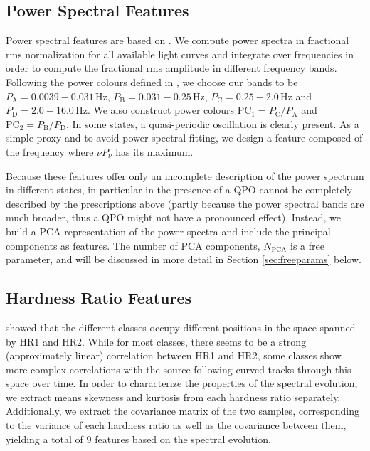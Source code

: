 \documentclass[12pt]{emulateapj}
\begin{document}
\subsection{Power Spectral Features}

Power spectral features are based on \citep{heil2015}. We compute power spectra in fractional rms normalization for all available light curves and integrate over frequencies in order to compute the fractional rms amplitude in different frequency bands. 
Following the power colours defined in \citet{heil2015}, we choose our bands to be $P_\mathrm{A} = 0.0039-0.031 \,\mathrm{Hz}$, 
$P_\mathrm{B} = 0.031-0.25 \,\mathrm{Hz}$, $P_\mathrm{C} =  0.25-2.0 \,\mathrm{Hz}$ and $P_\mathrm{D} = 2.0-16.0 \,\mathrm{Hz}$. We also construct power colours $\mathrm{PC}_1 = P_\mathrm{C}/P_\mathrm{A}$ and  $\mathrm{PC}_2 = P_\mathrm{B}/P_\mathrm{D}$.
In some states, a quasi-periodic oscillation is clearly present. As a simple proxy and to avoid power spectral fitting, we design a feature composed of the frequency where $\nu P_\nu$ has its maximum. 

Because these features offer only an incomplete description of the power spectrum in different states, in particular in the presence of a QPO cannot be completely described by the prescriptions above (partly because the power spectral bands are much broader, thus a QPO might not have a pronounced effect). Instead, we build a PCA representation of the power spectra and include the principal components as features. The number of PCA components, $N_\mathrm{PCA}$ is a free parameter, and will be discussed in more detail in Section \ref{sec:freeparams} below. 

\subsection{Hardness Ratio Features}

\citet{belloni2000} showed that the different classes occupy different positions in the space spanned by HR1 and HR2. While for most classes, there seems to be a strong (approximately linear) correlation between HR1 and HR2, some classes show more complex correlations with the source following curved tracks through this space over time. In order to characterize the properties of the spectral evolution, we extract means skewness and kurtosis from each hardness ratio separately. Additionally, we extract the covariance matrix of the two samples, corresponding to the variance of each hardness ratio as well as the covariance between them, yielding a total of $9$ features based on the spectral evolution.
\end{document}
